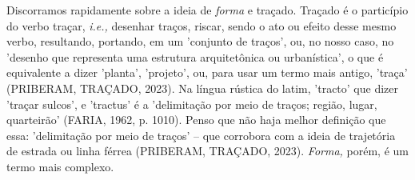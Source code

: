 \documentclass[twoside, 12pt, english,italian,latin,greek,french,spanish,brazil]{book}
\begin{document}
    Discorramos rapidamente sobre a ideia de \textit{forma} e traçado. Traçado é o particípio do verbo traçar, \textit{i.e.,} desenhar traços, riscar, sendo o ato ou efeito desse mesmo verbo, resultando, portando, em um 'conjunto de traços', ou, no nosso caso, no 'desenho que representa uma estrutura arquitetônica ou urbanística', o que é equivalente a dizer 'planta', 'projeto', ou, para usar um termo mais antigo, 'traça' (PRIBERAM, TRAÇADO, 2023). Na língua rústica do latim, 'tracto' que dizer 'traçar sulcos', e 'tractus' é a 'delimitação por meio de traços; região, lugar, quarteirão' (FARIA, 1962, p. 1010). Penso que não haja melhor definição que essa: 'delimitação por meio de traços' – que corrobora com a ideia de trajetória de estrada ou linha férrea (PRIBERAM, TRAÇADO, 2023). \textit{Forma,} porém, é um termo mais complexo.
    
\end{document}

